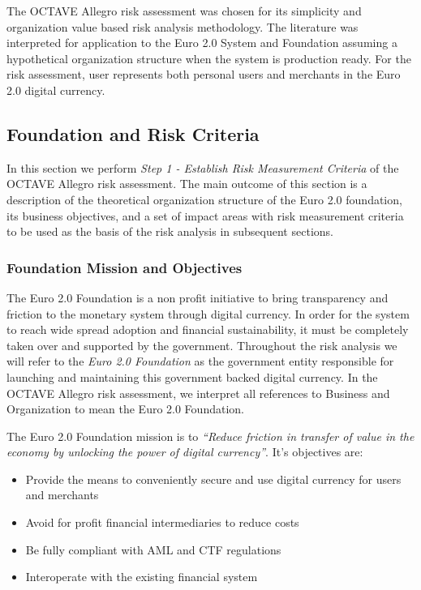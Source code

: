 \documentclass[a4paper,12pt]{article} %
\begin{document}
{The OCTAVE Allegro risk assessment was chosen for its simplicity and organization value based risk analysis methodology. The literature was interpreted for application to the Euro 2.0 System and Foundation assuming a hypothetical organization structure when the system is production ready. For the risk assessment, user represents both personal users and merchants in the Euro 2.0 digital currency.

\subsection{Foundation and Risk Criteria} \label{ssec:5.1}
In this section we perform \textit{Step 1 - Establish Risk Measurement Criteria} of the OCTAVE Allegro risk assessment. The main outcome of this section is a description of the theoretical organization structure of the Euro 2.0 foundation, its business objectives, and a set of impact areas with risk measurement criteria to be used as the basis of the risk analysis in subsequent sections.

\subsubsection{Foundation Mission and Objectives} \label{sssec:5.1:objectives}

The Euro 2.0 Foundation is a non profit initiative to bring transparency and friction to the monetary system through digital currency. In order for the system to reach wide spread adoption and financial sustainability, it must be completely taken over and supported by the government. Throughout the risk analysis we will refer to the \textit{Euro 2.0 Foundation} as the government entity responsible for launching and maintaining this government backed digital currency. In the OCTAVE Allegro risk assessment, we interpret all references to Business and Organization to mean the Euro 2.0 Foundation.

The Euro 2.0 Foundation mission is to \textit{``Reduce friction in transfer of value in the economy by unlocking the power of digital currency''}. It's objectives are:

\begin{itemize}
	\item Provide the means to conveniently secure and use digital currency for users and merchants
	\item Avoid for profit financial intermediaries to reduce costs
	\item Be fully compliant with AML and CTF regulations
	\item Interoperate with the existing financial system
\end{itemize}

}
\end{document}

